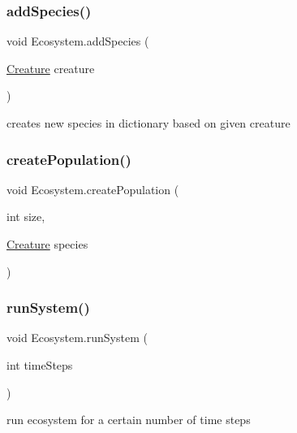 \subsubsection{\texorpdfstring{add\+Species()}{addSpecies()}}
{\footnotesize\ttfamily void Ecosystem.\+add\+Species (\begin{DoxyParamCaption}\item[{\mbox{\hyperlink{class_creature}{Creature}}}]{creature }\end{DoxyParamCaption})}



creates new species in dictionary based on given creature 

\mbox{\label{class_ecosystem_a887af939d4bf8e17701dc1a4af875e7f}} 
\subsubsection{\texorpdfstring{create\+Population()}{createPopulation()}}
{\footnotesize\ttfamily void Ecosystem.\+create\+Population (\begin{DoxyParamCaption}\item[{int}]{size,  }\item[{\mbox{\hyperlink{class_creature}{Creature}}}]{species }\end{DoxyParamCaption})}

\mbox{\label{class_ecosystem_a2102d1d4f820c9913cccaf917df9879f}} 
\subsubsection{\texorpdfstring{run\+System()}{runSystem()}}
{\footnotesize\ttfamily void Ecosystem.\+run\+System (\begin{DoxyParamCaption}\item[{int}]{time\+Steps }\end{DoxyParamCaption})}



run ecosystem for a certain number of time steps 

\mbox{\label{class_ecosystem_a0e082a9b5c6e6df9cbe20da26d1d6968}} 
